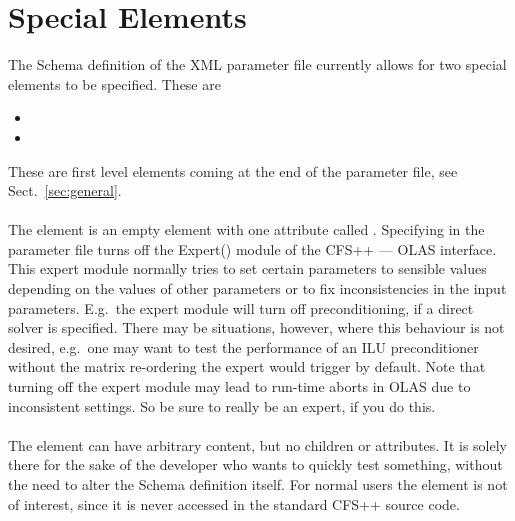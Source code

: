\chapter{Special Elements}
\label{chap:SpecialElements}
%
%
The Schema definition of the XML parameter file currently allows for two
special elements to be specified. These are
%
%
\begin{itemize}
\item {}
\item {}
\end{itemize}
%
%
These are first level elements coming at the end of the parameter file, see
Sect.~\ref{sec:general}.
%
%
\subsubsection*{}
%
%
The  element is an empty element with one attribute called
. Specifying  in the parameter
file
turns off the Expert() module of the CFS++ --- OLAS interface. This expert
module normally tries to set certain
parameters to sensible values depending on the values of other parameters or
to fix inconsistencies in the input parameters. E.g.~the expert module will
turn off preconditioning, if a direct solver is specified. There may be situations, however, where this behaviour is not
desired, e.g.~one may want to test the performance of an ILU preconditioner
without the  matrix re-ordering the expert would trigger by default.
Note that turning off the expert module may lead to run-time aborts in OLAS due
to inconsistent settings. So be sure to really be an expert, if you do this.
%
%
\subsubsection*{}
%
%
The  element can have arbitrary content, but no children or
attributes. It is solely there for the sake of the developer who wants to
quickly test something, without the need to alter the Schema definition itself.
For normal users the element is not of interest, since it is never accessed
in the standard CFS++ source code.

